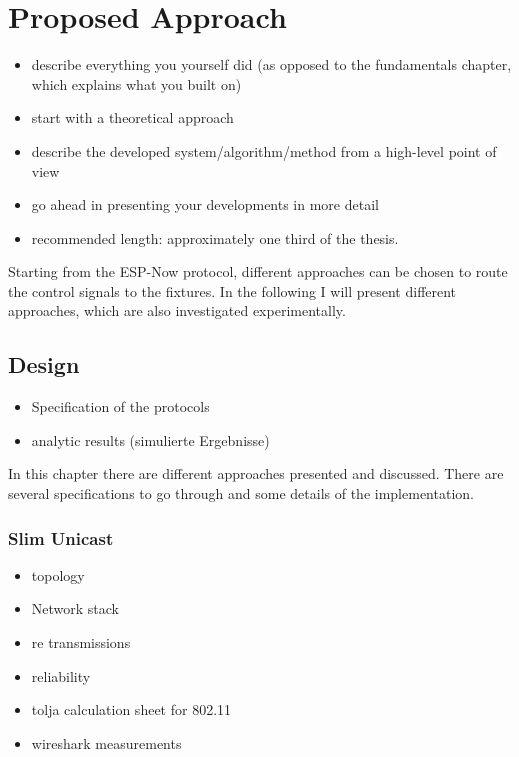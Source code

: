 \documentclass[]{ccs-thesis}
\begin{document}
\chapter{Proposed Approach}
\begin{itemize}
\item describe everything you yourself did (as opposed to the fundamentals chapter, which explains what you built on)
\item start with a theoretical approach
\item describe the developed system/algorithm/method from a high-level point of view
\item go ahead in presenting your developments in more detail
\item recommended length: approximately one third of the thesis.
\end{itemize}

Starting from the ESP-Now protocol, different approaches can be chosen to route the control signals to the fixtures. 
In the following I will present different approaches, which are also investigated experimentally.

\section{Design}
\label{sec:design}
\begin{itemize}
	\item Specification of the protocols
	\item analytic results (simulierte Ergebnisse)
\end{itemize}

In this chapter there are different approaches presented and discussed.
There are several specifications to go through and some details of the implementation.

\subsection{Slim Unicast}
\begin{itemize}
\item topology
\item Network stack
\item re transmissions
\item reliability
\item tolja calculation sheet for 802.11
\item wireshark measurements
\end{itemize}
\end{document}
